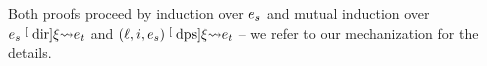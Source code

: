 Both proofs proceed by induction over $\datalangExpr_s$ and mutual induction over $\datalangExpr_s \tmcDir{\datalangRenaming} \datalangExpr_t$ and $(\datalangLoc, \datalangIdx, \datalangExpr_s) \tmcDps{\datalangRenaming} \datalangExpr_t$ -- we refer to our mechanization for the details.




